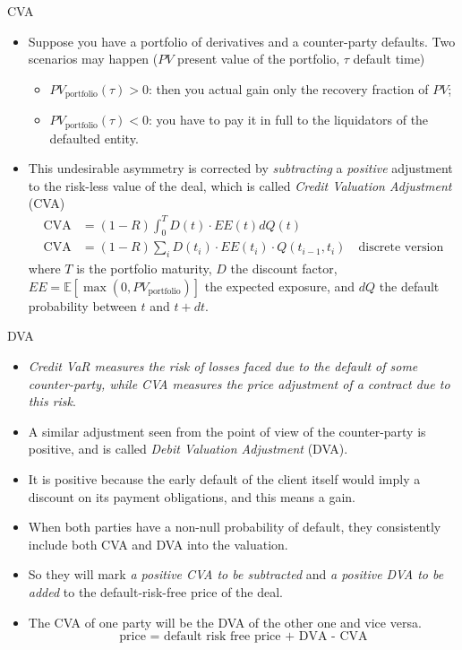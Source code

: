 \documentclass{beamer}
\begin{document}
\begin{frame}{CVA}
  \begin{itemize}
  \item Suppose you have a portfolio of derivatives and a counter-party defaults. Two scenarios may happen ($PV$ present value of the portfolio, $\tau$ default time)
    \begin{itemize}
    \item $PV_{\textrm{portfolio}}(\tau) > 0$: then you actual gain only the recovery fraction of $PV$;
    \item $PV_{\textrm{portfolio}}(\tau) < 0$: you have to pay it in full to the liquidators of the defaulted entity.
    \end{itemize}
  \item This undesirable asymmetry is corrected by \emph{subtracting} a \emph{positive} adjustment to the risk-less value of the deal, which is called \emph{Credit Valuation Adjustment} (CVA)
\begin{align*}
  \textrm{CVA} &= (1-R)\int_0^{T} D(t)\cdot EE(t) dQ(t) \\
  \textrm{CVA} &= (1-R)\sum_i D(t_i)\cdot EE(t_i)\cdot  Q(t_{i-1}, t_i) \quad \textrm{discrete version}
\end{align*}
where $T$ is the portfolio maturity, $D$ the discount factor, $EE=\mathbb{E}[\max(0, PV_{\textrm{portfolio}})]$ the expected exposure, and $dQ$ the default probability between $t$ and $t + dt$.
  \end{itemize}
\end{frame}

\begin{frame}{DVA}
  \begin{itemize}
  \item \emph{Credit VaR measures the risk of losses faced due to the default of some counter-party, while CVA measures the price adjustment of a contract due to this risk}.
  \item A similar adjustment seen from the point of view of the counter-party is positive, and is called \emph{Debit Valuation Adjustment} (DVA). 
  \item It is positive because the early default of the client itself would imply a discount on its payment obligations, and this means a gain.
  \item When both parties have a non-null probability of default, they consistently include both CVA and DVA into the valuation.
  \item So they will mark \emph{a positive CVA to be subtracted} and \emph{a positive DVA to be added} to the default-risk-free price of the deal. 
  \item The CVA of one party will be the DVA of the other one and vice versa.
    \begin{equation*}
      \textrm{price = default risk free price + DVA - CVA}
    \end{equation*}
  \end{itemize}
\end{frame}
\end{document}
